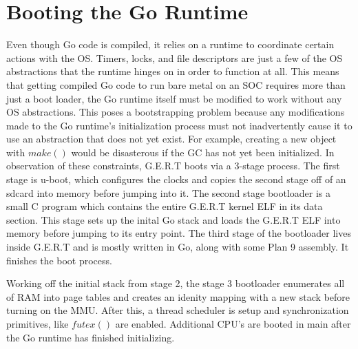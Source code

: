 \chapter{Booting the Go Runtime}

Even though Go code is compiled, it relies on a runtime to coordinate certain actions with the OS.
Timers, locks, and file descriptors are just a few of the OS abstractions that the runtime hinges on
in order to function at all. This means that getting compiled Go code to run bare metal on an SOC requires
more than just a boot loader, the Go runtime itself must be modified to work without any OS abstractions.
This poses a bootstrapping problem because any modifications made to the Go runtime's initialization
process must not inadvertently cause it to use an abstraction that does not yet exist. For example,
creating a new object with $make()$ would be disasterous if the GC has not yet been initialized.
In observation of these constraints, G.E.R.T boots via a 3-stage process. The first stage is u-boot, which
configures the clocks and copies the second stage off of an sdcard into memory before jumping into it. The second
stage bootloader is a small C program which contains the entire G.E.R.T kernel ELF in its data section. This stage sets
up the inital Go stack and loads the G.E.R.T ELF into memory before jumping to its entry point. The third stage
of the bootloader lives inside G.E.R.T and is mostly written in Go, along with some Plan 9 assembly. It finishes the
boot process.



Working off the
initial stack from stage 2, the stage 3 bootloader enumerates all of RAM into page tables and creates an idenity mapping
with a new stack before turning on the MMU. After this, a thread scheduler is setup and synchronization primitives, like
$futex()$ are enabled. Additional CPU's are booted in main after the Go runtime has finished initializing.

